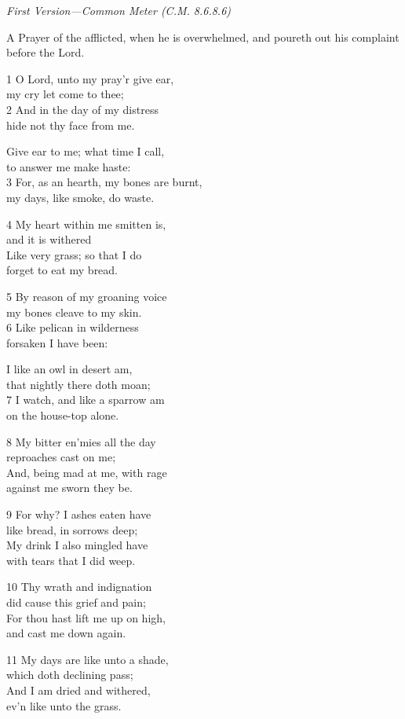 \emph{First Version---Common Meter (C.M. 8.6.8.6)}

A Prayer of the afflicted, when he is overwhelmed,
and poureth out his complaint before the Lord.

1 O Lord, unto my pray’r give ear,\\
my cry let come to thee;\\
2 And in the day of my distress\\
hide not thy face from me.

Give ear to me; what time I call,\\
to answer me make haste:\\
3 For, as an hearth, my bones are burnt,\\
my days, like smoke, do waste.

4 My heart within me smitten is,\\
and it is withered\\
Like very grass; so that I do\\
forget to eat my bread.

5 By reason of my groaning voice\\
my bones cleave to my skin.\\
6 Like pelican in wilderness\\
forsaken I have been:

I like an owl in desert am,\\
that nightly there doth moan;\\
7 I watch, and like a sparrow am\\
on the house-top alone.

8 My bitter en’mies all the day\\
reproaches cast on me;\\
And, being mad at me, with rage\\
against me sworn they be.

9 For why? I ashes eaten have\\
like bread, in sorrows deep;\\
My drink I also mingled have\\
with tears that I did weep.

10 Thy wrath and indignation\\
did cause this grief and pain;\\
For thou hast lift me up on high,\\
and cast me down again.

11 My days are like unto a shade,\\
which doth declining pass;\\
And I am dried and withered,\\
ev’n like unto the grass.

